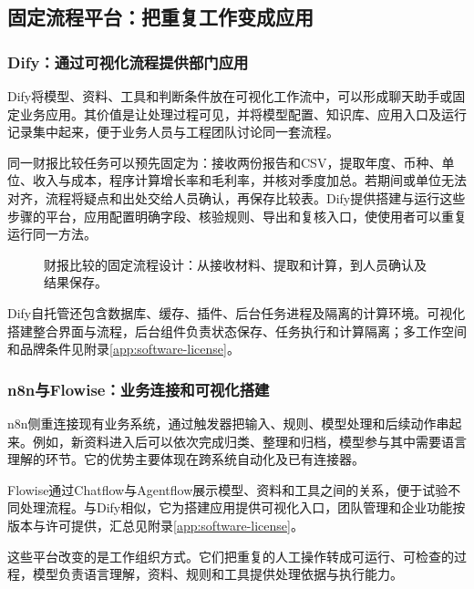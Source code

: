 \subsection{固定流程平台：把重复工作变成应用}
\subsubsection{Dify：通过可视化流程提供部门应用}
Dify将模型、资料、工具和判断条件放在可视化工作流中，可以形成聊天助手或固定业务应用。其价值是让处理过程可见，并将模型配置、知识库、应用入口及运行记录集中起来，便于业务人员与工程团队讨论同一套流程。

同一财报比较任务可以预先固定为：接收两份报告和CSV，提取年度、币种、单位、收入与成本，程序计算增长率和毛利率，并核对季度加总。若期间或单位无法对齐，流程将疑点和出处交给人员确认，再保存比较表。Dify提供搭建与运行这些步骤的平台，应用配置明确字段、核验规则、导出和复核入口，使使用者可以重复运行同一方法。

\begin{figure}[H]\centering
{}
\caption{财报比较的固定流程设计：从接收材料、提取和计算，到人员确认及结果保存。}
\end{figure}

Dify自托管还包含数据库、缓存、插件、后台任务进程及隔离的计算环境。可视化搭建整合界面与流程，后台组件负责状态保存、任务执行和计算隔离；多工作空间和品牌条件见附录\ref{app:software-license}。

\subsubsection{n8n与Flowise：业务连接和可视化搭建}
n8n侧重连接现有业务系统，通过触发器把输入、规则、模型处理和后续动作串起来。例如，新资料进入后可以依次完成归类、整理和归档，模型参与其中需要语言理解的环节。它的优势主要体现在跨系统自动化及已有连接器。

Flowise通过Chatflow与Agentflow展示模型、资料和工具之间的关系，便于试验不同处理流程。与Dify相似，它为搭建应用提供可视化入口，团队管理和企业功能按版本与许可提供，汇总见附录\ref{app:software-license}。

这些平台改变的是工作组织方式。它们把重复的人工操作转成可运行、可检查的过程，模型负责语言理解，资料、规则和工具提供处理依据与执行能力。


